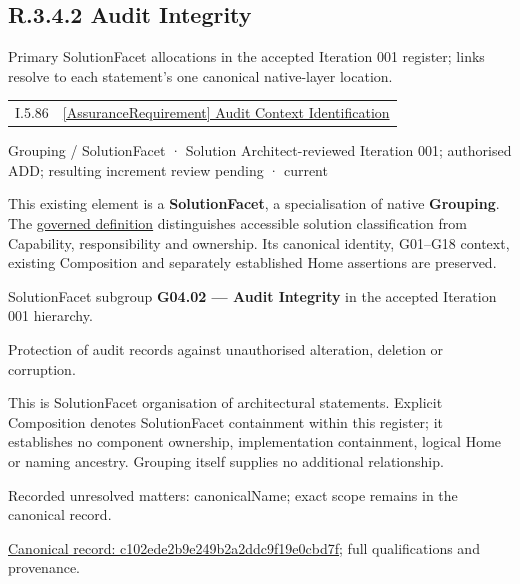 \subsection*{R.3.4.2 Audit Integrity}
\label{navigation:R.3.4.2}

Primary SolutionFacet allocations in the accepted Iteration 001 register; links resolve to each statement’s one canonical native-layer location.\par
\begin{longtable}{p{.22\linewidth}p{.73\linewidth}}
I.5.86 & \hyperref[element:de466c998be34fae87a2be41983cbcdd]{[AssuranceRequirement] Audit Context Identification} \\
\end{longtable}
\label{element:c102ede2b9e249b2a2ddc9f19e0cbd7f}
{\small Grouping / SolutionFacet · Solution Architect-reviewed Iteration 001; authorised ADD; resulting increment review pending · current}\par

This existing element is a \textbf{SolutionFacet}, a specialisation of native
\textbf{Grouping}. The \href{\detokenize{../../../../../../../governance/continuum-representation.md#solutionfacet-classification--1119-candidate}}{governed definition}
distinguishes accessible solution classification from Capability, responsibility
and ownership. Its canonical identity, G01–G18 context, existing Composition
and separately established Home assertions are preserved.



SolutionFacet subgroup \textbf{G04.02 — Audit Integrity} in the accepted Iteration 001 hierarchy.



Protection of audit records against unauthorised alteration, deletion or corruption.



This is SolutionFacet organisation of architectural statements. Explicit Composition denotes SolutionFacet containment within this register; it establishes no component ownership, implementation containment, logical Home or naming ancestry. Grouping itself supplies no additional relationship.


{\small Recorded unresolved matters: canonicalName; exact scope remains in the canonical record.}\par
{\footnotesize \href{../../../../../../../continuum/grouping/c102ede2b9e249b2a2ddc9f19e0cbd7f.md}{Canonical record: c102ede2b9e249b2a2ddc9f19e0cbd7f}; full qualifications and provenance.}\par
